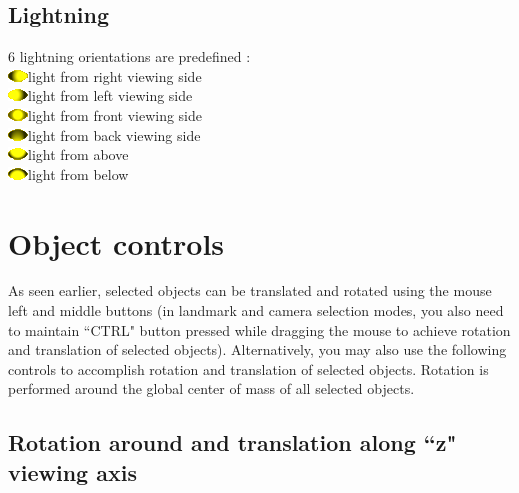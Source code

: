 \subsection{Lightning}
6 lightning orientations are predefined :\\
\includegraphics[scale=0.7]{images/06/other/light_right.png}light from right viewing side\\
\includegraphics[scale=0.7]{images/06/other/light_left.png}light from left viewing side\\
\includegraphics[scale=0.7]{images/06/other/light_front.png}light from front viewing side\\
\includegraphics[scale=0.7]{images/06/other/light_back.png}light from back viewing side\\
\includegraphics[scale=0.7]{images/06/other/light_above.png}light from above\\
\includegraphics[scale=0.7]{images/06/other/light_below.png}light from below\\

  \section{Object controls}
	As seen earlier, selected objects can be translated and rotated using the mouse left and middle buttons
(in landmark and camera selection modes, you also need to maintain ``CTRL" button pressed
while dragging the mouse to achieve rotation and translation of selected objects). Alternatively, you
may also use the following controls to accomplish rotation and translation of selected objects. Rotation
is performed around the global center of mass of all selected objects.

\subsection{Rotation around and translation along ``z" viewing axis}

